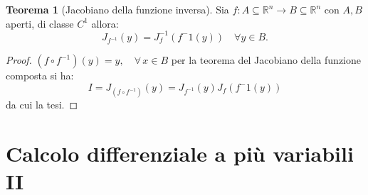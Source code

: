 \documentclass[leqno]{article}
\theoremstyle{definition}
\numberwithin{equation}{section}
\newtheorem{theorem}{Teorema}[section]
\theoremstyle{remark}
\begin{document}
	\begin{theorem}[Jacobiano della funzione inversa]
		Sia $f:A\subseteq \mathbb{R}^n \rightarrow B \subseteq \mathbb{R}^n$ con $A,B$ aperti, di classe $C^1$ allora:
		\begin{equation}
			J_{f^{-1}}(y) = J_f^{-1}(f^-1(y)) \quad \forall y \in B.
		\end{equation}
		\begin{proof}
			$(f\circ f^{-1})(y)=y, \quad \forall \, x \in B$ per la teorema del Jacobiano della funzione composta si ha: 
			\begin{equation}
				I=J_{(f \circ f^{-1})}(y)=J_{f^{-1}}(y)J_f(f^-1(y))
			\end{equation}
			da cui la tesi. 
		\end{proof}
	\end{theorem}
	
	
	\section{Calcolo differenziale a più variabili II}
	
\end{document}

